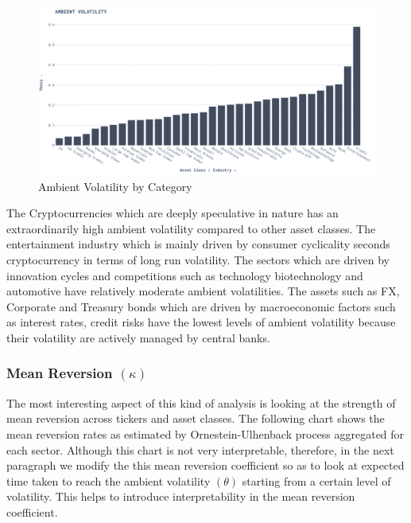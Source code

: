 \begin{figure}[H]
    \centering
    \includegraphics[width=\textwidth]{images/ambient_volatility_by_category.png}
    \caption{Ambient Volatility by Category}
    \label{fig:theta_by_category}
\end{figure}


The Cryptocurrencies which are deeply speculative in nature has an extraordinarily high ambient volatility compared to other asset classes. The entertainment industry which is mainly driven by consumer cyclicality seconds cryptocurrency in terms of long run volatility.
The sectors which are driven by innovation cycles and competitions such as technology biotechnology and automotive have relatively moderate ambient volatilities. The assets such as FX, Corporate and Treasury bonds  which are driven by macroeconomic factors such as interest rates, credit risks have the lowest levels of ambient volatility because their volatility are actively managed by central banks.


\subsubsection{ Mean Reversion $(\kappa)$}
The most interesting aspect of this kind of analysis is looking at the strength of mean reversion across tickers and asset classes.  The following chart shows the mean reversion rates as estimated by Ornestein-Ulhenback process aggregated for each sector. Although this chart is not very interpretable, therefore, in the next paragraph we modify the this mean reversion coefficient so as to look at expected time taken to reach the ambient volatility $(\theta)$ starting from a certain level of volatility. This helps to introduce interpretability in the mean reversion coefficient.

